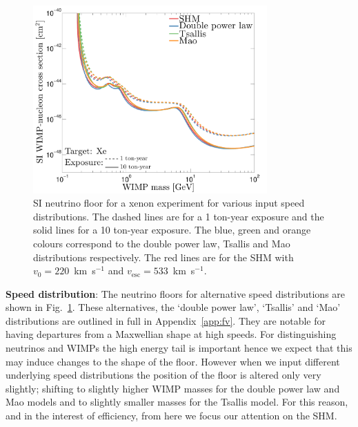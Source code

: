 \begin{figure}
\begin{center}
\includegraphics[trim = 0mm 0 0mm 0mm, clip, width=0.8\textwidth,angle=0]{Figures/DL_fv-eps-converted-to.pdf}
\caption[Neutrino floor with different input speed distributions]{SI neutrino floor for a xenon experiment for various input speed distributions. The dashed lines are for a 1 ton-year exposure and the solid lines for a 10 ton-year exposure. The blue, green and orange colours correspond to the double power law, Tsallis and Mao distributions respectively. The red lines are for the SHM with $v_0 = 220$~km~s$^{-1}$ and $v_\textrm{esc} = 533$~km~s$^{-1}$.}
\label{fig:DL_fv}
\end{center}
\end{figure} 
{\bf Speed distribution}: The neutrino floors for alternative speed distributions are shown in Fig.~\ref{fig:DL_fv}. These alternatives, the `double power law', `Tsallis' and `Mao' distributions are outlined in full in Appendix~\ref{app:fv}. They are notable for having departures from a Maxwellian shape at high speeds. For distinguishing neutrinos and WIMPs the high energy tail is important hence we expect that this may induce changes to the shape of the floor. However when we input different underlying speed distributions the position of the floor is altered only very slightly; shifting to slightly higher WIMP masses for the double power law and Mao models and to slightly smaller masses for the Tsallis model. For this reason, and in the interest of efficiency, from here we focus our attention on the SHM. 

